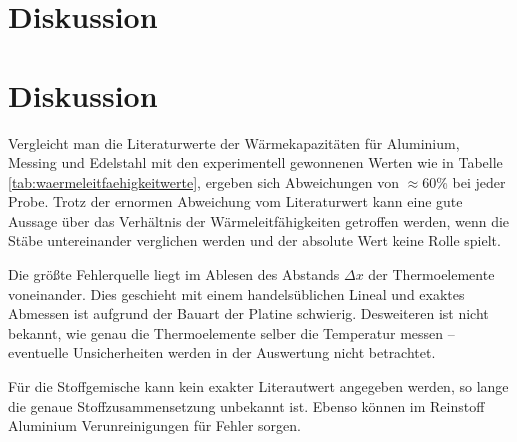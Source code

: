 \section{Diskussion}
\label{sec:Diskussion}
\section{Diskussion}
\label{sec:Diskussion}

Vergleicht man die Literaturwerte der Wärmekapazitäten für Aluminium, Messing und Edelstahl mit den experimentell gewonnenen Werten wie in Tabelle \ref{tab:waermeleitfaehigkeitwerte}, ergeben sich Abweichungen von $\approx60\%$ bei jeder Probe. Trotz der ernormen Abweichung vom Literaturwert kann eine gute Aussage über das Verhältnis der Wärmeleitfähigkeiten getroffen werden, wenn die Stäbe untereinander verglichen werden und der absolute Wert keine Rolle spielt.

Die größte Fehlerquelle liegt im Ablesen des Abstands $\Delta{x}$ der Thermoelemente voneinander. Dies geschieht mit einem handelsüblichen Lineal und exaktes Abmessen ist aufgrund der Bauart der Platine schwierig. Desweiteren ist nicht bekannt, wie genau die Thermoelemente selber die Temperatur messen -- eventuelle Unsicherheiten werden in der Auswertung nicht betrachtet.

Für die Stoffgemische kann kein exakter Literautwert angegeben werden, so lange die genaue Stoffzusammensetzung unbekannt ist. Ebenso können im Reinstoff Aluminium Verunreinigungen für Fehler sorgen. 
